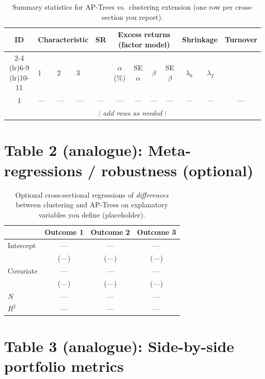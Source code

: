 \documentclass[11pt,a4paper]{article}
\begin{document}
\begin{table}[H]
  \centering
  \caption{Summary statistics for AP-Trees vs.\ clustering extension (one row per cross-section you report).}
  \label{tab:summary}
  \small
  \begin{tabular}{@{}c lll c cccc cc c@{}}
    \toprule
    ID & \multicolumn{3}{c}{Characteristic} & SR & \multicolumn{4}{c}{Excess returns (factor model)} & \multicolumn{2}{c}{Shrinkage} & Turnover \\
    \cmidrule(lr){2-4} \cmidrule(lr){6-9} \cmidrule(lr){10-11}
    & 1 & 2 & 3 & & $\alpha$ (\%) & SE $\alpha$ & $\beta$ & SE $\beta$ & $\lambda_0$ & $\lambda_2$ & \\
    \midrule
    1 & --- & --- & --- & --- & --- & --- & --- & --- & --- & --- & --- \\
    \multicolumn{12}{c}{\textit{$\vdots$ add rows as needed $\vdots$}} \\
    \bottomrule
  \end{tabular}
\end{table}

\section*{Table 2 (analogue): Meta-regressions / robustness (optional)}

\begin{table}[H]
  \centering
  \caption{Optional cross-sectional regressions of \emph{differences} between clustering and AP-Trees on explanatory variables you define (placeholder).}
  \label{tab:meta}
  \begin{tabular}{@{}l ccc@{}}
    \toprule
    & Outcome 1 & Outcome 2 & Outcome 3 \\
    \midrule
    Intercept & --- & --- & --- \\
    & \footnotesize (---) & \footnotesize (---) & \footnotesize (---) \\
    Covariate & --- & --- & --- \\
    & \footnotesize (---) & \footnotesize (---) & \footnotesize (---) \\
    \midrule
    $N$ & --- & --- & --- \\
    $R^2$ & --- & --- & --- \\
    \bottomrule
  \end{tabular}
\end{table}

\section*{Table 3 (analogue): Side-by-side portfolio metrics}
\end{document}
